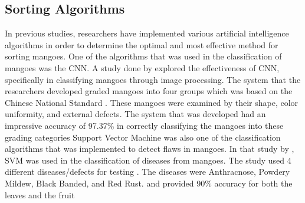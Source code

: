 \subsection{Sorting Algorithms}
In previous studies, researchers have implemented various artificial intelligence
algorithms in order to determine the optimal and most effective method for sorting
mangoes. One of the algorithms that was used in the classification of mangoes was the
\gls{CNN}. A study done by \citet{zheng-mango-2021}
explored the effectiveness of \gls{CNN}, specifically in classifying mangoes through image
processing. The system that the researchers developed graded mangoes into four groups
which was based on the Chinese National Standard \citep{zheng-mango-2021}. These mangoes were examined by
their shape, color uniformity, and external defects. The system that was developed had
an impressive accuracy of 97.37\% in correctly classifying the mangoes into these
grading categories
Support Vector Machine was also one of the classification algorithms that was
implemented to detect flaws in mangoes. In that study by \citet{veling-mango-2019}, SVM
was used in the classification of diseases from mangoes. The study used 4 different
diseases/defects for testing \citep{veling-mango-2019}. The diseases were Anthracnose, Powdery Mildew, Black
Banded, and Red Rust. and provided 90\% accuracy for both the leaves and the fruit

